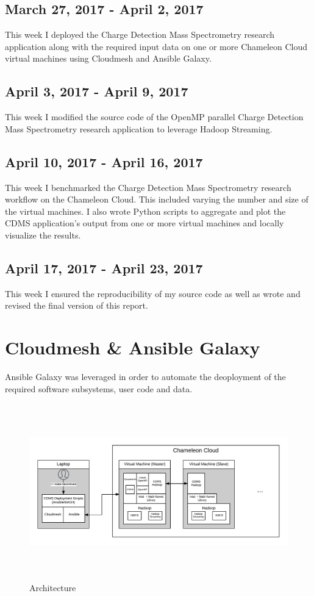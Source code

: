 \documentclass[9pt,twocolumn,twoside]{../../styles/osajnl}
\begin{document}
\subsection{March 27, 2017 - April 2, 2017}
This week I deployed the Charge Detection Mass Spectrometry research
application along with the required input data on one or more
Chameleon Cloud virtual machines using Cloudmesh and Ansible Galaxy.
\subsection{April 3, 2017 - April 9, 2017}
This week I modified the source code of the OpenMP parallel Charge
Detection Mass Spectrometry research application to leverage Hadoop
Streaming.
\subsection{April 10, 2017 - April 16, 2017}
This week I benchmarked the Charge Detection Mass Spectrometry
research workflow on the Chameleon Cloud. This included varying the
number and size of the virtual machines. I also wrote Python scripts
to aggregate and plot the CDMS application's output from one or more
virtual machines and locally visualize the results.
\subsection{April 17, 2017 - April 23, 2017}
This week I ensured the reproducibility of my source code as well as
wrote and revised the final version of this report.

\section{Cloudmesh \& Ansible Galaxy} \label{ansible}
Ansible Galaxy was leveraged in order to automate the deoployment of
the required software subsystems, user code and data.

\begin{figure}
\centering
\includegraphics[height=3.0in, width=\textwidth]{images/architecture}
\caption{Architecture}
\end{figure}
\end{document}

